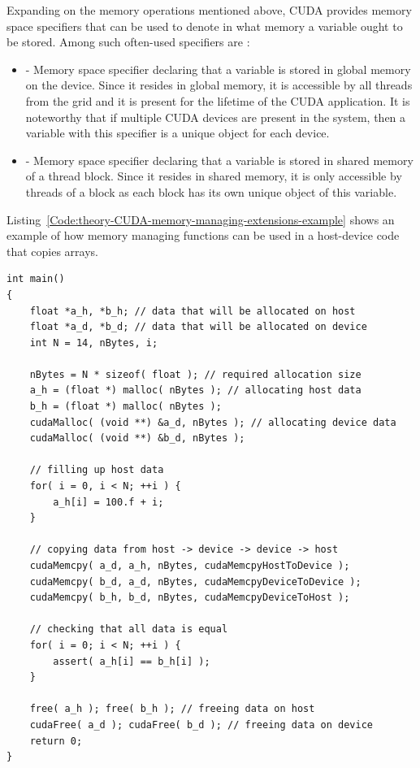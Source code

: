 Expanding on the memory operations mentioned above, CUDA provides memory space specifiers that can be used to denote in what memory a variable ought to be stored. Among such often-used specifiers are \cite{NVIDIAMay2022}:

\begin{itemize}
	\item {} - Memory space specifier declaring that a variable is stored in global memory on the device. Since it resides in global memory, it is accessible by all threads from the grid and it is present for the lifetime of the CUDA application. It is noteworthy that if multiple CUDA devices are present in the system, then a variable with this specifier is a unique object for each device.
	\item {} - Memory space specifier declaring that a variable is stored in shared memory of a thread block. Since it resides in shared memory, it is only accessible by threads of a block as each block has its own unique object of this variable.
\end{itemize}

Listing~\ref{Code:theory-CUDA-memory-managing-extensions-example} shows an example of how memory managing functions can be used in a host-device code that copies arrays.

\begin{lstlisting}[caption= Example of code that utilizes CUDA memory managing extensions of C++. Taken from \emph{Formats for storage of sparse matrices on GPU} \cite{Cejka2020} and Nvidia's \emph{Getting Started with CUDA} presentation \cite{Ruetsch2008}.,label=Code:theory-CUDA-memory-managing-extensions-example]
int main()
{
	float *a_h, *b_h; // data that will be allocated on host
	float *a_d, *b_d; // data that will be allocated on device
	int N = 14, nBytes, i;
	
	nBytes = N * sizeof( float ); // required allocation size
	a_h = (float *) malloc( nBytes ); // allocating host data
	b_h = (float *) malloc( nBytes ); 
	cudaMalloc( (void **) &a_d, nBytes ); // allocating device data
	cudaMalloc( (void **) &b_d, nBytes );
	
	// filling up host data
	for( i = 0, i < N; ++i ) {
		a_h[i] = 100.f + i;
	}

	// copying data from host -> device -> device -> host
	cudaMemcpy( a_d, a_h, nBytes, cudaMemcpyHostToDevice );
	cudaMemcpy( b_d, a_d, nBytes, cudaMemcpyDeviceToDevice );
	cudaMemcpy( b_h, b_d, nBytes, cudaMemcpyDeviceToHost );
	
	// checking that all data is equal
	for( i = 0; i < N; ++i ) {
		assert( a_h[i] == b_h[i] );
	}

	free( a_h ); free( b_h ); // freeing data on host
	cudaFree( a_d ); cudaFree( b_d ); // freeing data on device
	return 0;
}
\end{lstlisting}

